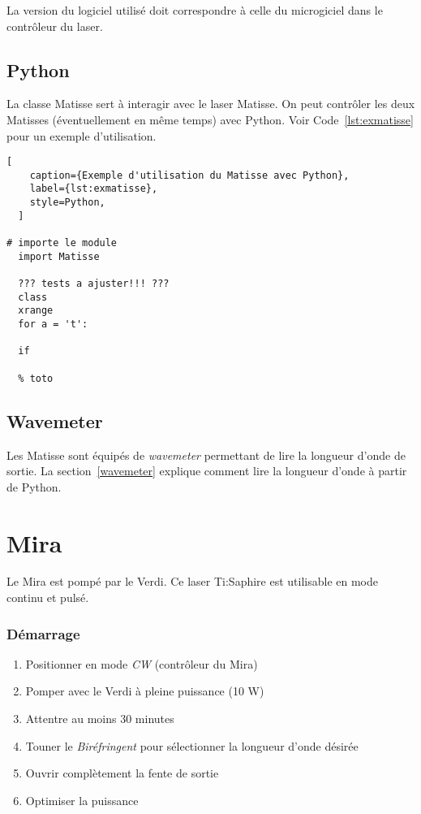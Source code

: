 \documentclass[11pt,francais]{book} %
\begin{document}
La version du logiciel utilisé doit correspondre à celle du microgiciel dans le contrôleur du laser.

\subsection{Python}

La classe Matisse sert à interagir avec le laser Matisse.
On peut contrôler les deux Matisses (éventuellement en même temps) avec Python.
Voir Code~\ref{lst:exmatisse} pour un exemple d'utilisation.

\begin{lstlisting}[
    caption={Exemple d'utilisation du Matisse avec Python},
    label={lst:exmatisse},
    style=Python,
  ]

# importe le module
  import Matisse

  ??? tests a ajuster!!! ???
  class
  xrange
  for a = 't':

  if

  % toto
\end{lstlisting}

\subsection{Wavemeter}

Les Matisse sont équipés de {\it wavemeter} permettant de lire la longueur d'onde de sortie.
La section~\ref{wavemeter} explique comment lire la longueur d'onde à partir de Python.


\section{Mira}

Le Mira est pompé par le Verdi. Ce laser Ti:Saphire est utilisable en mode continu et pulsé.

\subsubsection{Démarrage}

\begin{enumerate}
\item Positionner en mode {\it CW} (contrôleur du Mira)
\item Pomper avec le Verdi à pleine puissance (10 W)
\item Attentre au moins 30 minutes
\item Touner le {\it Biréfringent} pour sélectionner la longueur d'onde désirée
\item Ouvrir complètement la fente de sortie
\item Optimiser la puissance
\end{enumerate}
\end{document}
